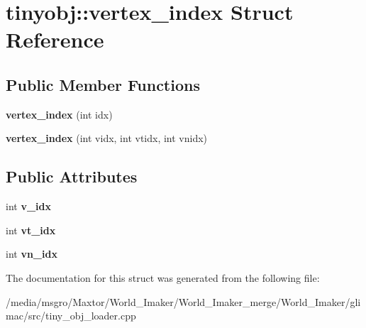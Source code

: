 \hypertarget{structtinyobj_1_1vertex__index}{}\section{tinyobj\+:\+:vertex\+\_\+index Struct Reference}
\label{structtinyobj_1_1vertex__index}
\subsection*{Public Member Functions}
\begin{DoxyCompactItemize}
\item 
\mbox{\label{structtinyobj_1_1vertex__index_a894075fa64d32082219c138f111e4753}} 
{\bfseries vertex\+\_\+index} (int idx)
\item 
\mbox{\label{structtinyobj_1_1vertex__index_aa3c4d6bcba36c2abb06e25497a1376a1}} 
{\bfseries vertex\+\_\+index} (int vidx, int vtidx, int vnidx)
\end{DoxyCompactItemize}
\subsection*{Public Attributes}
\begin{DoxyCompactItemize}
\item 
\mbox{\label{structtinyobj_1_1vertex__index_a91a2616fb97e0da915a40654edf9b558}} 
int {\bfseries v\+\_\+idx}
\item 
\mbox{\label{structtinyobj_1_1vertex__index_aae7e058d3aa0993aa05e95d82dd6b8bf}} 
int {\bfseries vt\+\_\+idx}
\item 
\mbox{\label{structtinyobj_1_1vertex__index_a30f2a63a5ed20cc3ad64e340c4020da8}} 
int {\bfseries vn\+\_\+idx}
\end{DoxyCompactItemize}


The documentation for this struct was generated from the following file\+:\begin{DoxyCompactItemize}
\item 
/media/msgro/\+Maxtor/\+World\+\_\+\+Imaker/\+World\+\_\+\+Imaker\+\_\+merge/\+World\+\_\+\+Imaker/glimac/src/tiny\+\_\+obj\+\_\+loader.\+cpp\end{DoxyCompactItemize}

